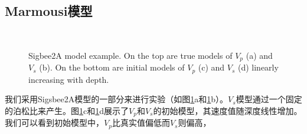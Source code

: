 \subsection{Marmousi模型}
\begin{figure}
   \centering
   \\
   \caption{Sigbee2A model example. On the top are true models of 
   $V_p$ (a) and $V_s$ (b). On the bottom are initial models of $V_p$ (c) and $V_s$
   (d) linearly increasing with depth. }
   \label{fig:TrueAndInitial}
\end{figure}
我们采用Sigsbee2A模型的一部分来进行实验（如图\ref{fig:TrueAndInitial}a和\ref{fig:TrueAndInitial}b）。$V_s$模型通过一个固定的泊松比来产生。图\ref{fig:TrueAndInitial}c和\ref{fig:TrueAndInitial}d展示了$V_p$和$V_s$的初始模型，其速度值随深度线性增加。我们可以看到初始模型中，$V_p$比真实值偏低而$V_s$则偏高，
